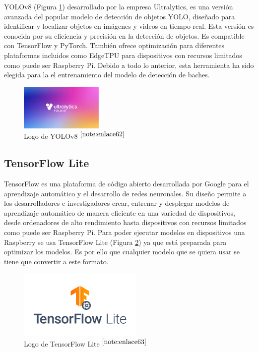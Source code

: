\acs{YOLO}v8 (Figura \ref{fig:yolov8}) desarrollado por la empresa Ultralytics, es una versión avanzada del popular modelo de detección de objetos \ac{YOLO}, diseñado para identificar y localizar objetos en imágenes y videos en tiempo real. Esta versión es conocida por su eficiencia y precisión en la detección de objetos. Es compatible con TensorFlow y PyTorch. También ofrece optimización para diferentes plataformas incluidos como EdgeTPU para dispositivos con recursos limitados como puede ser Raspberry Pi. Debido a todo lo anterior, esta herramienta ha sido elegida para la el entrenamiento del modelo de detección de baches. 

\begin{figure} [h!]
	\begin{center}
		\includegraphics[width=4cm]{figs/yolov8.png}
	\end{center}
	\caption{Logo de YOLOv8 $^{\ref{note:enlace62}}$} 
	\label{fig:yolov8}
\end{figure}

\setcounter{footnote}{62} %


\subsection{TensorFlow Lite}

TensorFlow es una plataforma de código abierto desarrollada por Google para el aprendizaje automático y el desarrollo de redes neuronales. Su diseño permite a los desarrolladores e investigadores crear, entrenar y desplegar modelos de aprendizaje automático de manera eficiente en una variedad de dispositivos, desde ordenadores de alto rendimiento hasta dispositivos con recursos limitados como puede ser Raspberry Pi. Para poder ejecutar modelos en dispositivos una Raspberry se usa TensorFlow Lite (Figura \ref{fig:tflite}) ya que está preparada para optimizar los modelos. Es por ello que cualquier modelo que se quiera usar se tiene que convertir a este formato. 

\begin{figure} [h!]
	\begin{center}
		\includegraphics[width=6cm]{figs/tflite.png}
	\end{center}
	\caption{Logo de TensorFlow Lite $^{\ref{note:enlace63}}$} 
	\label{fig:tflite}
\end{figure}

